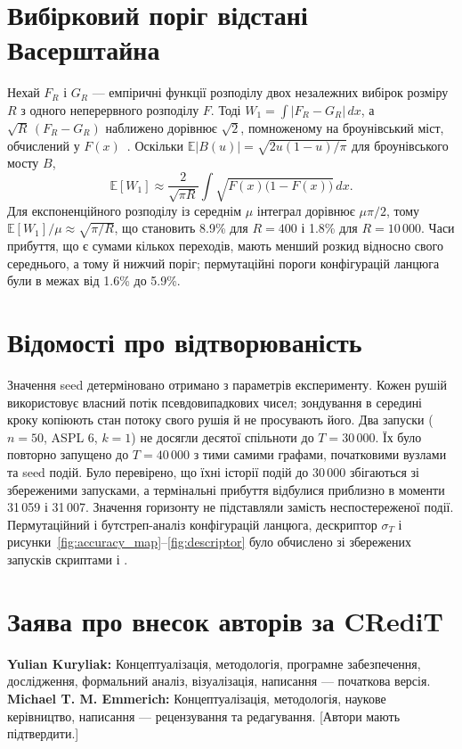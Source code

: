 \clearpage
\section{Вибірковий поріг відстані Васерштайна}
\label{app:floor}

Нехай $F_R$ і $G_R$ --- емпіричні функції розподілу двох незалежних вибірок розміру $R$ з одного неперервного розподілу $F$. Тоді $W_1=\int|F_R-G_R|\,dx$, а $\sqrt{R}\,(F_R-G_R)$ наближено дорівнює $\sqrt{2}$, помноженому на броунівський міст, обчислений у $F(x)$~\citep{delbarrio1999}. Оскільки $\mathbb{E}|B(u)|=\sqrt{2u(1-u)/\pi}$ для броунівського мосту $B$,
\[
\mathbb{E}[W_1]\approx\frac{2}{\sqrt{\pi R}}\int\sqrt{F(x)\bigl(1-F(x)\bigr)}\,dx .
\]
Для експоненційного розподілу із середнім $\mu$ інтеграл дорівнює $\mu\pi/2$, тому $\mathbb{E}[W_1]/\mu\approx\sqrt{\pi/R}$, що становить 8.9\% для $R=400$ і 1.8\% для $R=10\,000$. Часи прибуття, що є сумами кількох переходів, мають менший розкид відносно свого середнього, а тому й нижчий поріг; пермутаційні пороги конфігурацій ланцюга були в межах від 1.6\% до 5.9\%.

\clearpage
\section{Відомості про відтворюваність}
\label{app:repro}

Значення seed детерміновано отримано з параметрів експерименту. Кожен рушій \TS{} використовує власний потік псевдовипадкових чисел; зондування в середині кроку копіюють стан потоку свого рушія й не просувають його. Два запуски \Full{} ($n=50$, ASPL 6, $k=1$) не досягли десятої спільноти до $T=30\,000$. Їх було повторно запущено до $T=40\,000$ з тими самими графами, початковими вузлами та seed подій. Було перевірено, що їхні історії подій до 30\,000 збігаються зі збереженими запусками, а термінальні прибуття відбулися приблизно в моменти 31\,059 і 31\,007. Значення горизонту не підставляли замість неспостереженої події. Пермутаційний і бутстреп-аналіз конфігурацій ланцюга, дескриптор $\sigma_T$ і рисунки~\ref{fig:accuracy_map}--\ref{fig:descriptor} було обчислено зі збережених запусків скриптами  і .

\section*{Заява про внесок авторів за CRediT}
\textbf{Yulian Kuryliak:} Концептуалізація, методологія, програмне забезпечення, дослідження, формальний аналіз, візуалізація, написання --- початкова версія. \textbf{Michael T. M. Emmerich:} Концептуалізація, методологія, наукове керівництво, написання --- рецензування та редагування. [Автори мають підтвердити.]

